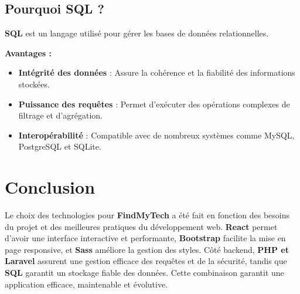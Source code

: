 \documentclass[a4paper,12pt]{article}
\begin{document}
\subsection{Pourquoi SQL ?}
\textbf{SQL} est un langage utilisé pour gérer les bases de données relationnelles.

\textbf{Avantages :}
\begin{itemize}
    \item \textbf{Intégrité des données} : Assure la cohérence et la fiabilité des informations stockées.
    \item \textbf{Puissance des requêtes} : Permet d’exécuter des opérations complexes de filtrage et d’agrégation.
    \item \textbf{Interopérabilité} : Compatible avec de nombreux systèmes comme MySQL, PostgreSQL et SQLite.
\end{itemize}

\section{Conclusion}
Le choix des technologies pour \textbf{FindMyTech} a été fait en fonction des besoins du projet et des meilleures pratiques du développement web. \textbf{React} permet d’avoir une interface interactive et performante, \textbf{Bootstrap} facilite la mise en page responsive, et \textbf{Sass} améliore la gestion des styles. Côté backend, \textbf{PHP et Laravel} assurent une gestion efficace des requêtes et de la sécurité, tandis que \textbf{SQL} garantit un stockage fiable des données. Cette combinaison garantit une application efficace, maintenable et évolutive.
\end{document}
